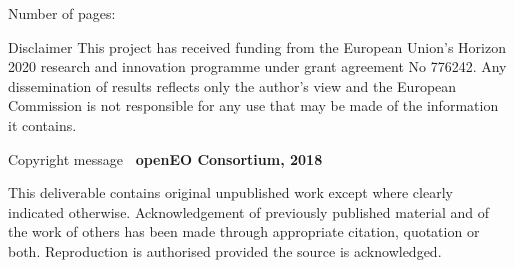 \begin{versionhistory}
\end{versionhistory}

\vspace{1cm}

Number of pages: {\bfseries \pageref{LastPage}}

\vspace{3cm}

\begin{myenv}{Disclaimer}
This project has received funding from the European Union's Horizon 2020 research and innovation programme under grant agreement No 776242. Any dissemination of results reflects only the author's view and the European Commission is not responsible for any use that may be made of the information it contains.
\end{myenv}

\vspace{2cm}

\begin{myenv}{Copyright message}
  {\bfseries\textcopyright~openEO Consortium, 2018}

  {\raggedright This deliverable contains original unpublished work except where clearly indicated otherwise. Acknowledgement of previously published material and of the work of others has been made through appropriate citation, quotation or both. Reproduction is authorised provided the source is acknowledged.}
\end{myenv}

\newpage